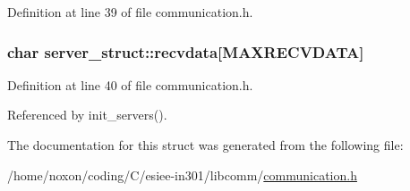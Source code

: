 Definition at line 39 of file communication.h.\hypertarget{structserver__struct_a157cab1fdf76eee8fbe32dc7dd425d1}{
\subsubsection{\setlength{\rightskip}{0pt plus 5cm}char {\bf server\_\-struct::recvdata}\mbox{[}MAXRECVDATA\mbox{]}}}
\label{structserver__struct_a157cab1fdf76eee8fbe32dc7dd425d1}




Definition at line 40 of file communication.h.

Referenced by init\_\-servers().

The documentation for this struct was generated from the following file:\begin{CompactItemize}
\item 
/home/noxon/coding/C/esiee-in301/libcomm/\hyperlink{communication_8h}{communication.h}\end{CompactItemize}
